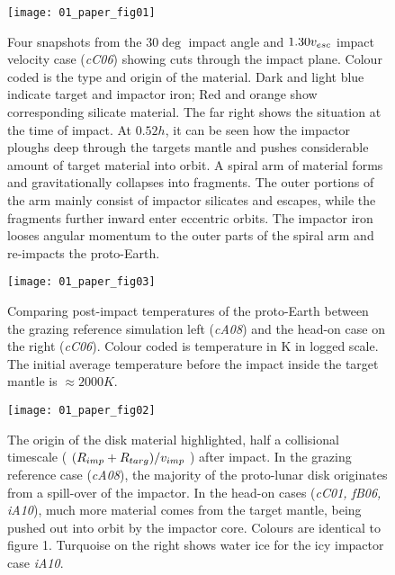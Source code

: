 \begin{figure}
\begin{center}
\texttt{[image: 01\_paper\_fig01]}
\caption{Four snapshots from the $30 \deg$ impact angle and $1.30 v_{esc}$ impact velocity case (\emph{cC06}) showing cuts through the impact plane. Colour coded is the type and origin of the material. Dark and light blue indicate target and impactor iron; Red and orange show corresponding silicate material. The far right shows the situation at the time of impact. At $0.52 h$, it can be seen how the impactor ploughs deep through the targets mantle and pushes considerable amount of target material into orbit. A spiral arm of material forms and gravitationally collapses into fragments. The outer portions of the arm mainly consist of impactor silicates and escapes, while the fragments further inward enter eccentric orbits. The impactor iron looses angular momentum to the outer parts of the spiral arm and re-impacts the proto-Earth.}
\label{ch05_fig01a}
\end{center}
\end{figure}

\begin{figure}
\begin{center}
\texttt{[image: 01\_paper\_fig03]}
\caption{Comparing post-impact temperatures of the proto-Earth between the grazing reference simulation left (\emph{cA08}) and the head-on case on the right (\emph{cC06}). Colour coded is temperature in K in logged scale. The initial average temperature before the impact inside the target mantle is $\approx 2000 K$.}
\label{ch05_fig01c}
\end{center}
\end{figure}

\begin{figure}
\begin{center}
\texttt{[image: 01\_paper\_fig02]}
\caption{The origin of the disk material highlighted, half a collisional timescale ( $ (R_{imp} + R_{targ}) / v_{imp}$ ) after impact. In the grazing reference case (\emph{cA08}), the majority of the proto-lunar disk originates from a spill-over of the impactor. In the head-on cases (\emph{cC01, fB06, iA10}), much more material comes from the target mantle, being pushed out into orbit by the impactor core. Colours are
identical to figure 1. Turquoise on the right shows water ice for the icy impactor case \emph{iA10}.}
\label{ch05_fig01b}
\end{center}
\end{figure}

